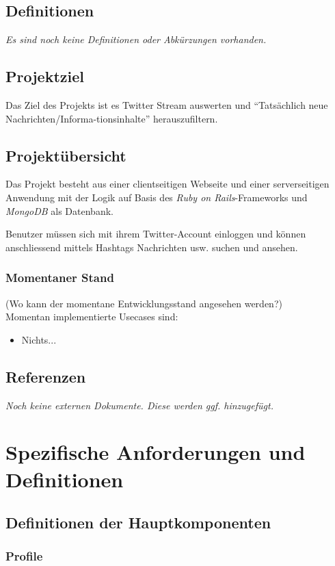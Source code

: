\documentclass[a4wide]{article}
\begin{document}
\subsection{Definitionen}
\textit{Es sind noch keine Definitionen oder Abk\"urzungen vorhanden.}
\subsection{Projektziel}
Das Ziel des Projekts ist es Twitter Stream auswerten und \enquote{Tats\"achlich neue Nachrichten/Informa-tionsinhalte} herauszufiltern.

\subsection{Projekt\"ubersicht}
Das Projekt besteht aus einer clientseitigen Webseite und einer serverseitigen Anwendung mit der Logik auf Basis des \emph{Ruby on Rails}-Frameworks und \emph{MongoDB} als Datenbank.

Benutzer m\"ussen sich mit ihrem Twitter-Account einloggen und k\"onnen anschliessend mittels Hashtags Nachrichten usw. suchen und ansehen.

\subsubsection{Momentaner Stand}
(Wo kann der momentane Entwicklungsstand angesehen werden?)\\
Momentan implementierte Usecases sind: 
\begin{itemize}
\item Nichts...
\end{itemize}

\subsection{Referenzen}
\textit{Noch keine externen Dokumente. Diese werden ggf. hinzugef\"ugt.}
\section{Spezifische Anforderungen und Definitionen}
\subsection{Definitionen der Hauptkomponenten}
\subsubsection{Profile}
\end{document}
